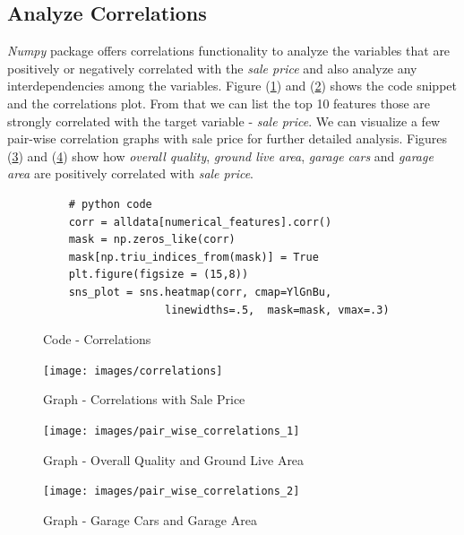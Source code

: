 \documentclass[sigconf]{acmart}
\begin{document}
	\subsection{Analyze Correlations}		
	{\em Numpy} package offers correlations functionality to analyze the variables that are positively or negatively correlated with the {\em sale price} and also analyze any interdependencies among the variables. Figure (\ref{c:cor}) and (\ref{fig:correlations}) shows the code snippet and the correlations plot. From that we can list the top 10 features those are strongly correlated with the target variable - {\em sale price}. We can visualize a few pair-wise correlation graphs with sale price for further detailed analysis. Figures (\ref{fig:pair-wise-correlations}) and (\ref{fig:pair-wise-correlations-2}) show how {\em overall quality}, {\em ground live area}, {\em garage cars} and {\em garage area} are positively correlated with {\em sale price}.
	
	\begin{figure}[htb]
	\begin{verbatim}	
	# python code 
	corr = alldata[numerical_features].corr()	
	mask = np.zeros_like(corr)
	mask[np.triu_indices_from(mask)] = True	
	plt.figure(figsize = (15,8))	
	sns_plot = sns.heatmap(corr, cmap=YlGnBu, 
	               linewidths=.5,  mask=mask, vmax=.3)	
	\end{verbatim}
	\caption{Code - Correlations} \label{c:cor} 
	\end{figure}

	\begin{figure}[htb]
		\centering
		\texttt{[image: images/correlations]}	
		\caption{Graph - Correlations with Sale Price} \label{fig:correlations} 
	\end{figure}
		
	\begin{figure}[htb]
		\centering
		\texttt{[image: images/pair\_wise\_correlations\_1]}	
		\caption{Graph - Overall Quality and Ground Live Area} \label{fig:pair-wise-correlations} 
	\end{figure}

	\begin{figure}[htb]
	\centering
	\texttt{[image: images/pair\_wise\_correlations\_2]}	
	\caption{Graph - Garage Cars and Garage Area} \label{fig:pair-wise-correlations-2} 
	\end{figure}
\end{document}
